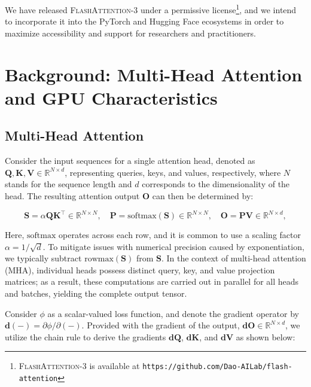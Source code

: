 We have released \textsc{FlashAttention-3} under a permissive license\footnote{\textsc{FlashAttention-3}
  is available at \texttt{https://github.com/Dao-AILab/flash-attention}}, and we intend to incorporate it into the PyTorch and Hugging Face ecosystems in order to maximize accessibility and support for researchers and practitioners.

\section{Background: Multi-Head Attention and GPU Characteristics}
\label{sec:background}

\subsection{Multi-Head Attention}
\label{subsec:multi_head_attn}

Consider the input sequences for a single attention head, denoted as $\mathbf{Q}, \mathbf{K}, \mathbf{V} \in \mathbb{R}^{N \times d}$, representing queries, keys, and values, respectively, where $N$ stands for the sequence length and $d$ corresponds to the dimensionality of the head. The resulting attention output $\mathbf{O}$ can then be determined by:

\begin{equation*}
  \mathbf{S} = \alpha \mathbf{Q} \mathbf{K}^\top \in \mathbb{R}^{N \times N}, \quad \mathbf{P} = \mathrm{softmax}(\mathbf{S}) \in \mathbb{R}^{N \times N}, \quad \mathbf{O} = \mathbf{P}\mathbf{V} \in \mathbb{R}^{N \times d},
\end{equation*}

Here, $\mathrm{softmax}$ operates across each row, and it is common to use a scaling factor $\alpha = 1/\sqrt{d}$. To mitigate issues with numerical precision caused by exponentiation, we typically subtract $\mathrm{rowmax}(\mathbf{S})$ from $\mathbf{S}$. In the context of multi-head attention (MHA), individual heads possess distinct query, key, and value projection matrices; as a result, these computations are carried out in parallel for all heads and batches, yielding the complete output tensor.

Consider $\phi$ as a scalar-valued loss function, and denote the gradient operator by $\mathbf{d}(-) = \partial \phi / \partial (-)$. Provided with the gradient of the output, $\mathbf{dO} \in \mathbb{R}^{N \times d}$, we utilize the chain rule to derive the gradients $\mathbf{dQ}$, $\mathbf{dK}$, and $\mathbf{dV}$ as shown below:

